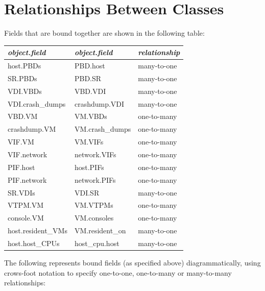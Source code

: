 \section{Relationships Between Classes}
Fields that are bound together are shown in the following table: 
\begin{center}\begin{tabular}{|ll|l|}
\hline
{\em object.field} & {\em object.field} & {\em relationship} \\

\hline
host.PBDs & PBD.host & many-to-one\\
SR.PBDs & PBD.SR & many-to-one\\
VDI.VBDs & VBD.VDI & many-to-one\\
VDI.crash\_dumps & crashdump.VDI & many-to-one\\
VBD.VM & VM.VBDs & one-to-many\\
crashdump.VM & VM.crash\_dumps & one-to-many\\
VIF.VM & VM.VIFs & one-to-many\\
VIF.network & network.VIFs & one-to-many\\
PIF.host & host.PIFs & one-to-many\\
PIF.network & network.PIFs & one-to-many\\
SR.VDIs & VDI.SR & many-to-one\\
VTPM.VM & VM.VTPMs & one-to-many\\
console.VM & VM.consoles & one-to-many\\
host.resident\_VMs & VM.resident\_on & many-to-one\\
host.host\_CPUs & host\_cpu.host & many-to-one\\
\hline
\end{tabular}\end{center}

The following represents bound fields (as specified above) diagrammatically, using crows-foot notation to specify one-to-one, one-to-many or many-to-many
                   relationships:

\begin{center}\end{center}
\
